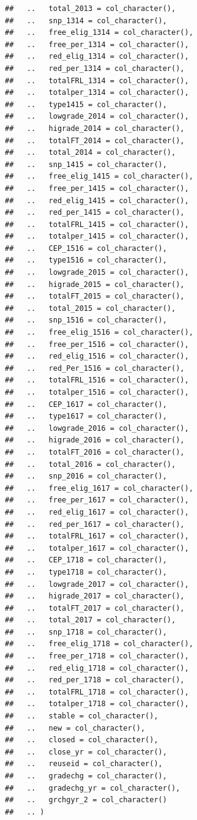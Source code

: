 \documentclass[
]{book}
\begin{document}
\begin{verbatim}
##   ..   total_2013 = col_character(),
##   ..   snp_1314 = col_character(),
##   ..   free_elig_1314 = col_character(),
##   ..   free_per_1314 = col_character(),
##   ..   red_elig_1314 = col_character(),
##   ..   red_per_1314 = col_character(),
##   ..   totalFRL_1314 = col_character(),
##   ..   totalper_1314 = col_character(),
##   ..   type1415 = col_character(),
##   ..   lowgrade_2014 = col_character(),
##   ..   higrade_2014 = col_character(),
##   ..   totalFT_2014 = col_character(),
##   ..   total_2014 = col_character(),
##   ..   snp_1415 = col_character(),
##   ..   free_elig_1415 = col_character(),
##   ..   free_per_1415 = col_character(),
##   ..   red_elig_1415 = col_character(),
##   ..   red_per_1415 = col_character(),
##   ..   totalFRL_1415 = col_character(),
##   ..   totalper_1415 = col_character(),
##   ..   CEP_1516 = col_character(),
##   ..   type1516 = col_character(),
##   ..   lowgrade_2015 = col_character(),
##   ..   higrade_2015 = col_character(),
##   ..   totalFT_2015 = col_character(),
##   ..   total_2015 = col_character(),
##   ..   snp_1516 = col_character(),
##   ..   free_elig_1516 = col_character(),
##   ..   free_per_1516 = col_character(),
##   ..   red_elig_1516 = col_character(),
##   ..   red_Per_1516 = col_character(),
##   ..   totalFRL_1516 = col_character(),
##   ..   totalper_1516 = col_character(),
##   ..   CEP_1617 = col_character(),
##   ..   type1617 = col_character(),
##   ..   lowgrade_2016 = col_character(),
##   ..   higrade_2016 = col_character(),
##   ..   totalFT_2016 = col_character(),
##   ..   total_2016 = col_character(),
##   ..   snp_2016 = col_character(),
##   ..   free_elig_1617 = col_character(),
##   ..   free_per_1617 = col_character(),
##   ..   red_elig_1617 = col_character(),
##   ..   red_per_1617 = col_character(),
##   ..   totalFRL_1617 = col_character(),
##   ..   totalper_1617 = col_character(),
##   ..   CEP_1718 = col_character(),
##   ..   type1718 = col_character(),
##   ..   lowgrade_2017 = col_character(),
##   ..   higrade_2017 = col_character(),
##   ..   totalFT_2017 = col_character(),
##   ..   total_2017 = col_character(),
##   ..   snp_1718 = col_character(),
##   ..   free_elig_1718 = col_character(),
##   ..   free_per_1718 = col_character(),
##   ..   red_elig_1718 = col_character(),
##   ..   red_per_1718 = col_character(),
##   ..   totalFRL_1718 = col_character(),
##   ..   totalper_1718 = col_character(),
##   ..   stable = col_character(),
##   ..   new = col_character(),
##   ..   closed = col_character(),
##   ..   close_yr = col_character(),
##   ..   reuseid = col_character(),
##   ..   gradechg = col_character(),
##   ..   gradechg_yr = col_character(),
##   ..   grchgyr_2 = col_character()
##   .. )
\end{verbatim}
\end{document}
